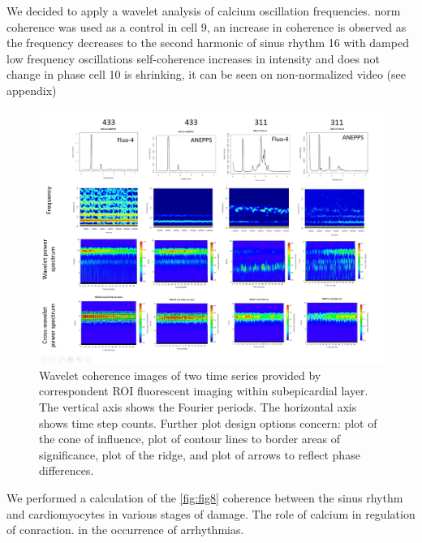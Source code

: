 \documentclass{biophys-new}
\begin{document}
We decided to apply a wavelet analysis of calcium oscillation frequencies. \cite{addison2018introduction}
norm coherence was used as a control
in cell 9, an increase in coherence is observed as the frequency decreases to the second harmonic of sinus rhythm
16 with damped low frequency oscillations
self-coherence increases in intensity and does not change in phase
cell 10 is shrinking, it can be seen on non-normalized video (see appendix)

\begin{figure}[hbt!]
\centering
\includegraphics[width=0.8\linewidth]{fig9.png}
\caption{Wavelet coherence images of two time series provided by correspondent ROI fluorescent imaging within subepicardial layer.
The vertical axis shows the Fourier periods. The horizontal axis shows time step counts.
Further plot design options concern: plot of the cone of influence, plot of contour lines to border areas of significance, plot of the ridge, and plot of arrows to reflect phase differences.}
\label{fig:fig9}
\end{figure}


We performed a calculation of the \ref{fig:fig8} coherence between the sinus rhythm and cardiomyocytes in various stages of damage.
The role of calcium in regulation of conraction.
in the occurrence of arrhythmias.
\end{document}
